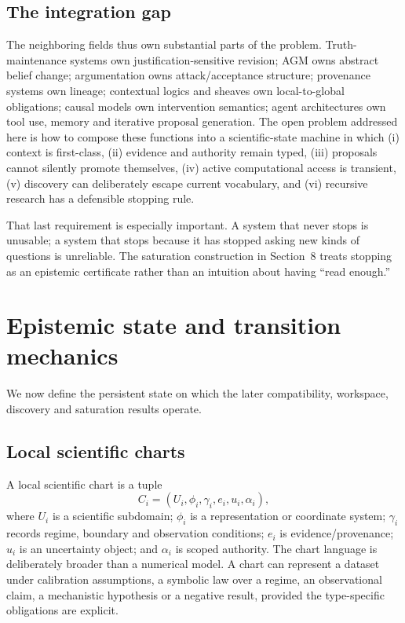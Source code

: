 \subsection{The integration gap}

The neighboring fields thus own substantial parts of the problem. Truth-maintenance systems own justification-sensitive revision; AGM owns abstract belief change; argumentation owns attack/acceptance structure; provenance systems own lineage; contextual logics and sheaves own local-to-global obligations; causal models own intervention semantics; agent architectures own tool use, memory and iterative proposal generation. The open problem addressed here is how to compose these functions into a scientific-state machine in which (i) context is first-class, (ii) evidence and authority remain typed, (iii) proposals cannot silently promote themselves, (iv) active computational access is transient, (v) discovery can deliberately escape current vocabulary, and (vi) recursive research has a defensible stopping rule.

That last requirement is especially important. A system that never stops is unusable; a system that stops because it has stopped asking new kinds of questions is unreliable. The saturation construction in Section~8 treats stopping as an epistemic certificate rather than an intuition about having ``read enough.''

\section{Epistemic state and transition mechanics}

We now define the persistent state on which the later compatibility, workspace, discovery and saturation results operate.

\subsection{Local scientific charts}

A local scientific chart is a tuple
\[
C_i=(U_i,\phi_i,\gamma_i,e_i,u_i,\alpha_i),
\]
where \(U_i\) is a scientific subdomain; \(\phi_i\) is a representation or coordinate system; \(\gamma_i\) records regime, boundary and observation conditions; \(e_i\) is evidence/provenance; \(u_i\) is an uncertainty object; and \(\alpha_i\) is scoped authority. The chart language is deliberately broader than a numerical model. A chart can represent a dataset under calibration assumptions, a symbolic law over a regime, an observational claim, a mechanistic hypothesis or a negative result, provided the type-specific obligations are explicit.

